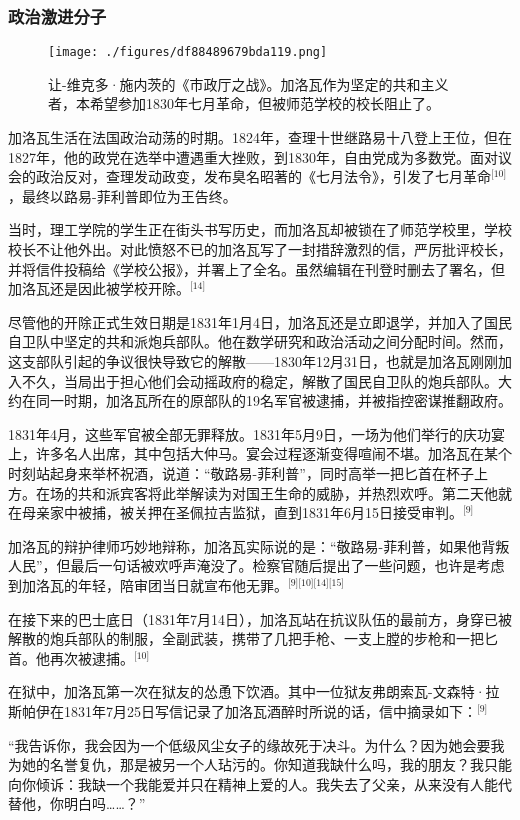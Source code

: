 \subsubsection{政治激进分子}
\begin{figure}[ht]
\centering
\texttt{[image: ./figures/df88489679bda119.png]}
\caption{让-维克多·施内茨的《市政厅之战》。加洛瓦作为坚定的共和主义者，本希望参加1830年七月革命，但被师范学校的校长阻止了。} \label{fig_AWLS_3}
\end{figure}
加洛瓦生活在法国政治动荡的时期。1824年，查理十世继路易十八登上王位，但在1827年，他的政党在选举中遭遇重大挫败，到1830年，自由党成为多数党。面对议会的政治反对，查理发动政变，发布臭名昭著的《七月法令》，引发了七月革命\(^\text{[10]}\)，最终以路易-菲利普即位为王告终。

当时，理工学院的学生正在街头书写历史，而加洛瓦却被锁在了师范学校里，学校校长不让他外出。对此愤怒不已的加洛瓦写了一封措辞激烈的信，严厉批评校长，并将信件投稿给《学校公报》，并署上了全名。虽然编辑在刊登时删去了署名，但加洛瓦还是因此被学校开除。\(^\text{[14]}\)

尽管他的开除正式生效日期是1831年1月4日，加洛瓦还是立即退学，并加入了国民自卫队中坚定的共和派炮兵部队。他在数学研究和政治活动之间分配时间。然而，这支部队引起的争议很快导致它的解散——1830年12月31日，也就是加洛瓦刚刚加入不久，当局出于担心他们会动摇政府的稳定，解散了国民自卫队的炮兵部队。大约在同一时期，加洛瓦所在的原部队的19名军官被逮捕，并被指控密谋推翻政府。

1831年4月，这些军官被全部无罪释放。1831年5月9日，一场为他们举行的庆功宴上，许多名人出席，其中包括大仲马。宴会过程逐渐变得喧闹不堪。加洛瓦在某个时刻站起身来举杯祝酒，说道：“敬路易-菲利普”，同时高举一把匕首在杯子上方。在场的共和派宾客将此举解读为对国王生命的威胁，并热烈欢呼。第二天他就在母亲家中被捕，被关押在圣佩拉吉监狱，直到1831年6月15日接受审判。\(^\text{[9]}\)

加洛瓦的辩护律师巧妙地辩称，加洛瓦实际说的是：“敬路易-菲利普，如果他背叛人民”，但最后一句话被欢呼声淹没了。检察官随后提出了一些问题，也许是考虑到加洛瓦的年轻，陪审团当日就宣布他无罪。\(^\text{[9][10][14][15]}\)

在接下来的巴士底日（1831年7月14日），加洛瓦站在抗议队伍的最前方，身穿已被解散的炮兵部队的制服，全副武装，携带了几把手枪、一支上膛的步枪和一把匕首。他再次被逮捕。\(^\text{[10]}\)

在狱中，加洛瓦第一次在狱友的怂恿下饮酒。其中一位狱友弗朗索瓦-文森特·拉斯帕伊在1831年7月25日写信记录了加洛瓦酒醉时所说的话，信中摘录如下：\(^\text{[9]}\)

“我告诉你，我会因为一个低级风尘女子的缘故死于决斗。为什么？因为她会要我为她的名誉复仇，那是被另一个人玷污的。你知道我缺什么吗，我的朋友？我只能向你倾诉：我缺一个我能爱并只在精神上爱的人。我失去了父亲，从来没有人能代替他，你明白吗……？”

